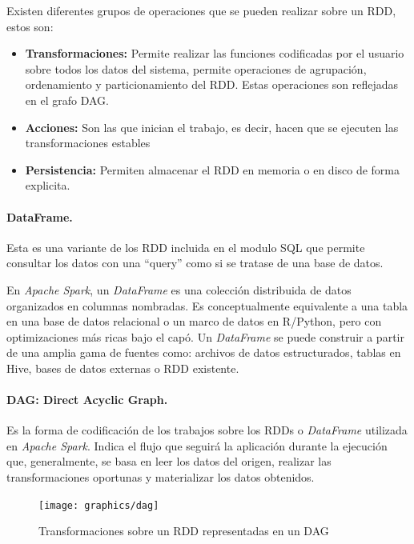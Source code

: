 Existen diferentes grupos de operaciones que se pueden realizar sobre un \gls{RDD}, estos son:

\begin{itemize}
	\item \textbf{Transformaciones:} Permite realizar las funciones codificadas por el usuario sobre todos los datos del sistema, permite operaciones de agrupación, ordenamiento y particionamiento del \gls{RDD}. Estas operaciones son reflejadas en el grafo \gls{DAG}.
	
	\item \textbf{Acciones:} Son las que inician el trabajo, es decir, hacen que se ejecuten las transformaciones estables
	
	\item \textbf{Persistencia:} Permiten almacenar el \gls{RDD} en memoria o en disco de forma explicita.
\end{itemize}

\paragraph{DataFrame.}
Esta es una variante de los \gls{RDD} incluida en el modulo \gls{SQL} que permite consultar los datos con una ``query'' como si se tratase de una base de datos.

En \textit{Apache Spark}, un \textit{DataFrame} es una colección distribuida de datos organizados en columnas nombradas. Es conceptualmente equivalente a una tabla en una base de datos relacional o un marco de datos en R/Python, pero con optimizaciones más ricas bajo el capó. Un \textit{DataFrame} se puede construir a partir de una amplia gama de fuentes como: archivos de datos estructurados, tablas en Hive, bases de datos externas o \gls{RDD} existente.

\paragraph{\gls{DAG}: Direct Acyclic Graph. \cite{dataframe}} 
Es la forma de codificación de los trabajos sobre los \gls{RDD}s o \textit{DataFrame} utilizada en \textit{Apache Spark}. Indica el flujo que seguirá la aplicación durante la ejecución que, generalmente, se basa en leer los datos del origen, realizar las transformaciones oportunas y materializar los datos obtenidos.

\begin{figure}[htp!]
	\centering
	\caption{Transformaciones sobre un \gls{RDD} representadas en un \gls{DAG} \cite{partsSpark}}
	\label{dag}
	\vspace{5pt}
	\texttt{[image: graphics/dag]}
\end{figure}

